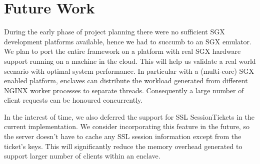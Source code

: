 \documentclass[../main.tex]{subfiles}
\begin{document}
\section{Future Work}
\label{sec:futurework}
During the early phase of project planning there were no sufficient SGX
development platforms available, hence we had to succumb to an SGX emulator. We
plan to port the entire framework on a platform with real SGX hardware support
running on a machine in the cloud. This will help us validate a real world
scenario with optimal system performance. In particular with a (multi-core) SGX
enabled platform, enclaves can distribute the workload generated from different
NGINX worker processes to separate threads. Consequently a large number of
client requests can be honoured concurrently.

In the interest of time, we also deferred the support for SSL SessionTickets in
the current implementation. We consider incorporating this feature in the
future, so the server doesn't have to cache any SSL session information except
from the ticket's keys. This will significantly reduce the memory overhead
generated to support larger number of clients within an enclave.
\end{document}
